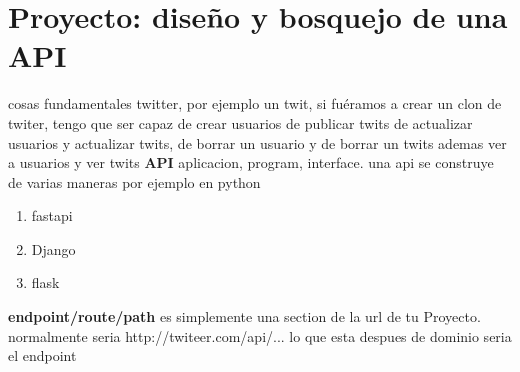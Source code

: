 \documentclass{article}
\begin{document}
    \section{Proyecto: diseño y bosquejo de una API}
    
    cosas fundamentales twitter, por ejemplo un twit, si fuéramos a crear un clon de twiter, tengo que ser capaz de crear usuarios de publicar twits de actualizar usuarios y actualizar twits, de borrar un usuario y de borrar un twits ademas ver a usuarios y ver twits 
    \textbf{API} aplicacion, program, interface. 
    una api se construye de varias maneras 
    por ejemplo en python \begin{enumerate}
        \item fastapi
        \item Django
        \item flask
    \end{enumerate}
    \textbf{endpoint/route/path} es simplemente una section de la url de tu Proyecto.
    normalmente seria http://twiteer.com/api/... lo que esta despues de dominio seria el endpoint
\end{document}
